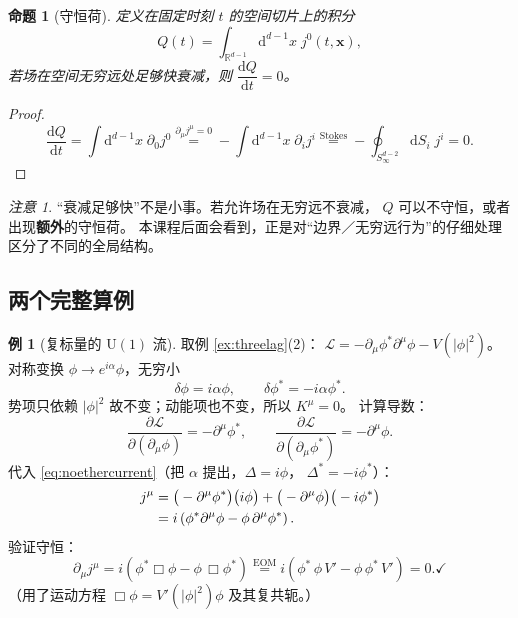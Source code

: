 \documentclass[UTF8,a4paper,11pt]{ctexart}
\theoremstyle{plain}
\newtheorem{proposition}{命题}[section]
\theoremstyle{definition}
\newtheorem{example}{例}[section]
\theoremstyle{remark}
\newtheorem{warning}{注意}[section]
\newcommand{\ext}{\mathrm{d}}          %
\newcommand{\RR}{\mathbb{R}}
\newcommand{\Uone}{\mathrm{U}(1)}
\newcommand{\Lag}{\mathcal{L}}
\newcommand{\PD}[2]{\frac{\partial #1}{\partial #2}}
\begin{document}
\begin{proposition}[守恒荷]
定义在固定时刻 $t$ 的空间切片上的积分
\begin{equation}
  Q(t)=\int_{\RR^{d-1}}\ext^{d-1}x\;j^0(t,\bm x),
  \label{eq:chargedef}
\end{equation}
若场在空间无穷远处足够快衰减，则 $\dfrac{\ext Q}{\ext t}=0$。
\end{proposition}

\begin{proof}
\begin{equation}
  \frac{\ext Q}{\ext t}
  =\int \ext^{d-1}x\;\partial_0 j^0
  \overset{\partial_\mu j^\mu=0}{=}
  -\int \ext^{d-1}x\;\partial_i j^i
  \overset{\text{Stokes}}{=}
  -\oint_{S^{d-2}_\infty}\ext S_i\;j^i=0 .
\end{equation}
\end{proof}

\begin{warning}
“衰减足够快”不是小事。若允许场在无穷远不衰减，
$Q$ 可以不守恒，或者出现\textbf{额外}的守恒荷。
本课程后面会看到，正是对“边界／无穷远行为”的仔细处理
区分了不同的全局结构。
\end{warning}

\subsection{两个完整算例}
\label{subsec:two-examples}

\begin{example}[复标量的 $\Uone$ 流]
\label{ex:u1current}
取例 \ref{ex:threelag}(2)：
$\Lag=-\partial_\mu\phi^*\partial^\mu\phi-V(|\phi|^2)$。
对称变换 $\phi\to e^{i\alpha}\phi$，无穷小
\begin{equation}
  \delta\phi=i\alpha\phi,\qquad \delta\phi^*=-i\alpha\phi^* .
\end{equation}
势项只依赖 $|\phi|^2$ 故不变；动能项也不变，所以 $K^\mu=0$。
计算导数：
\begin{equation}
  \PD{\Lag}{(\partial_\mu\phi)}=-\partial^\mu\phi^*,
  \qquad
  \PD{\Lag}{(\partial_\mu\phi^*)}=-\partial^\mu\phi .
\end{equation}
代入 \eqref{eq:noethercurrent}（把 $\alpha$ 提出，$\Delta=i\phi$，
$\Delta^*=-i\phi^*$）：
\begin{align}
  j^\mu
  &=\big(-\partial^\mu\phi^*\big)\big(i\phi\big)
   +\big(-\partial^\mu\phi\big)\big(-i\phi^*\big)
  \notag\\
  &=i\left(\phi^*\partial^\mu\phi-\phi\,\partial^\mu\phi^*\right).
  \label{eq:u1current}
\end{align}
验证守恒：
\begin{equation}
  \partial_\mu j^\mu
  =i\left(\phi^*\Box\phi-\phi\,\Box\phi^*\right)
  \overset{\text{EOM}}{=}
  i\left(\phi^*\,\phi\,V'-\phi\,\phi^*\,V'\right)=0 . \checkmark
\end{equation}
（用了运动方程 $\Box\phi=V'(|\phi|^2)\phi$ 及其复共轭。）
\end{example}
\end{document}
